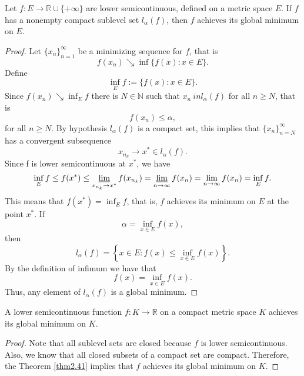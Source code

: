     \begin{theorem} \label{thm2.41}
        Let $f : E \to \mathbb{R} \cup \{+ \infty\}$ are lower semicontinuous, 
        defined on a metric space $E$. If $f$ has a nonempty compact sublevel
        set $l_{\alpha}(f)$, then $f$ achieves its global minimum on $E$. 
    \end{theorem}
    \begin{proof}
        Let $\{x_n\}_{n = 1}^{\infty}$ be a minimizing sequence for $f$, that is
        $$
            f(x_n) \searrow \inf\{f(x) : x \in E \}.
        $$
        Define 
        $$
            \inf_{E} f := \{ f(x) : x \in E \} .
        $$
        Since $f(x_n) \searrow \inf_{E} f $ there is $N \in \mathbb{N}$ such 
        that
        $x_n \ in l_{\alpha}(f)$ for all $n \geq N$, that is
        $$
            f(x_n) \leq \alpha ,
        $$
        for all $n \geq N$. By hypothesis $l_{\alpha}(f)$ is a compact set, 
        this implies
        that $\{x_n\}_{n=N}^{\infty}$ has a convergent subsequence
        $$
            x_{n_k} \to x^{*} \in l_{\alpha}(f).
        $$
        Since f is lower semicontinuous at $x^{*}$, we have 
        $$
            \inf_{E} f \leq f(x^*) \leq \varliminf_{x_{n_k} \to x^{*}} 
            f(x_{n_k}) %
            = \varliminf_{n \to \infty} f(x_n) = \lim_{n \to \infty} f(x_n) = 
            \inf_{E} f.
        $$
        This means that $f(x^{*}) = \inf_{E} f$, that is, $f$ achieves its 
        minimum
        on $E$ at the point $x^{*}$. If 
        $$
            \alpha = \inf_{x \in E} f(x),
        $$
        then
        $$
            l_{\alpha}(f) = \left\{ x \in E : f(x) \leq \inf_{x \in E} f(x) 
            \right\}.
        $$
        By the definition of infimum we have that 
        $$
            f(x) = \inf_{x \in E} f(x).
        $$
        Thus, any element of $l_{\alpha}(f)$ is a global minimum. 
    \end{proof}
    
    \begin{corollary}
        A lower semicontinuous function $f : K \to \mathbb{R}$ on a compact
        metric space $K$ achieves its global minimum on $K$.
    \end{corollary}
    \begin{proof}
        Note that all sublevel sets are closed because $f$ is lower 
        semicontinuous.
        Also, we know that all closed subsets of a compact set are compact. 
        Therefore,
        the Theorem \eqref{thm2.41} implies that $f$ achieves its global 
        minimum on $K$.
    \end{proof}
    
